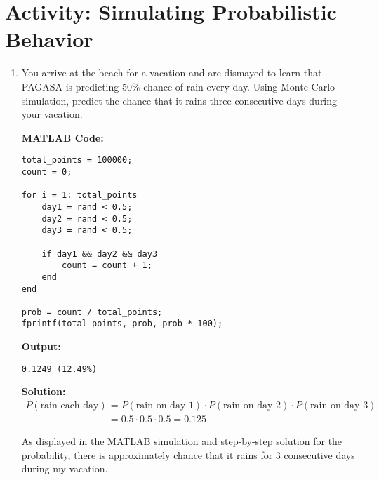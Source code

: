 \documentclass[legalpaper,11pt,extrafontsizes,oneside,openany,x11names]{memoir}
\begin{document}
\section*{Activity: Simulating Probabilistic Behavior}
\begin{enumerate}
    \item You arrive at the beach for a vacation and are dismayed to learn that PAGASA is predicting 50\% chance of rain every day. Using Monte Carlo simulation, predict the chance that it rains three consecutive days during your vacation.



\textbf{MATLAB Code:}
\begin{lstlisting}
total_points = 100000;
count = 0;

for i = 1: total_points
    day1 = rand < 0.5;
    day2 = rand < 0.5;
    day3 = rand < 0.5;

    if day1 && day2 && day3
        count = count + 1;
    end
end

prob = count / total_points;
fprintf(total_points, prob, prob * 100);
\end{lstlisting}

\textbf{Output:}

\begin{lstlisting}
0.1249 (12.49%)
\end{lstlisting}

\textbf{Solution:}
\begin{align*}
P(\text{rain each day}) 
&= P(\text{rain on day 1}) \cdot P(\text{rain on day 2}) \cdot P(\text{rain on day 3}) \\
&= 0.5 \cdot 0.5 \cdot 0.5 = \boxed{0.125}
\end{align*}

As displayed in the MATLAB simulation and step-by-step solution for the probability, there is approximately  chance that it rains for 3 consecutive days during my vacation.
\end{enumerate}
\end{document}
